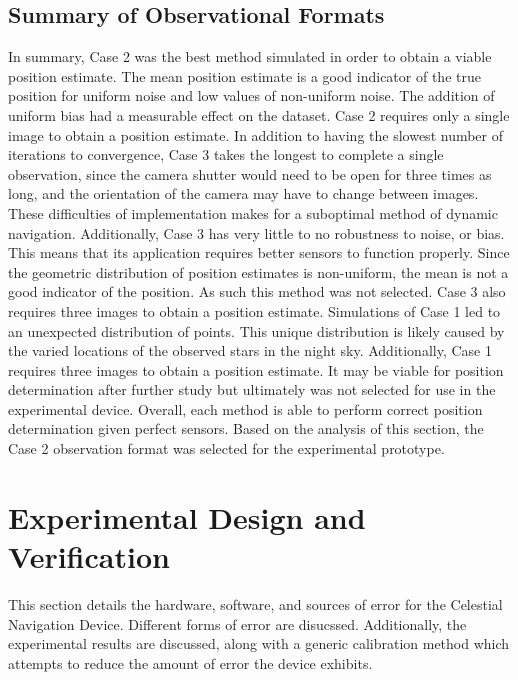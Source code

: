\documentclass[12pt,a4paper]{book}
\begin{document}
\section{Summary of Observational Formats}
In summary, Case 2 was the best method simulated in order to obtain a viable position estimate.  The mean position estimate is a good indicator of the true position for uniform noise and low values of non-uniform noise.  The addition of uniform bias had a measurable effect on the dataset.  Case 2 requires only a single image to obtain a position estimate.
In addition to having the slowest number of iterations to convergence, Case 3 takes the longest to complete a single observation, since the camera shutter would need to be open for three times as long, and the orientation of the camera may have to change between images.  These difficulties of implementation makes for a suboptimal method of dynamic navigation.  Additionally, Case 3 has very little to no robustness to noise, or bias. This means that its application requires better sensors to function properly.  Since the geometric distribution of position estimates is non-uniform, the mean is not a good indicator of the position.  As such this method was not selected. Case 3 also requires three images to obtain a position estimate. 
Simulations of Case 1 led to an unexpected distribution of points. This unique distribution is likely caused by the varied locations of the observed stars in the night sky. Additionally, Case 1 requires three images to obtain a position estimate.  It may be viable for position determination after further study but ultimately was not selected for use in the experimental device.
Overall, each method is able to perform correct position determination given perfect sensors.  Based on the analysis of this section, the Case 2 observation format was selected for the experimental prototype.



\chapter{Experimental Design and Verification}
This section details the hardware, software, and sources of error for the Celestial Navigation Device.  Different forms of error are disucssed.  Additionally, the experimental results are discussed, along with a generic calibration method which attempts to reduce the amount of error the device exhibits.
\end{document}
